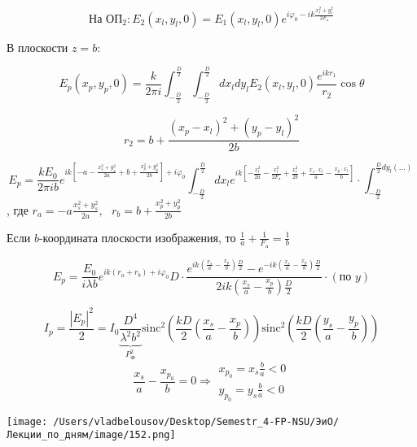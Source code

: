 \documentclass[12pt, a4paper]{report}
\begin{document}
\[ \text{На ОП}_2: E_2 (x_l , y_l , 0 ) = E_1 (x_l, y_l , 0 ) e^{i \varphi_0 - ik \frac{x_l ^2 + y_l ^2 }{2 F_{\text{л} } } }   \] 

В плоскости \( z =b : \) 

\[ E_p (x_p , y_p , 0 ) = \frac{k}{ 2 \pi i } \int_{- \frac{D}{2 } }^{\frac{D}{2 }  }\int_{-\frac{D}{2 } }^{\frac{D}{2 } } d x_l dy _l E_2(x_l , y_l ,0 ) \frac{e^{i k r_1 } }{r_2 } \cos \theta      \] 

\[ r_2 = b + \frac{ (x_p - x_l ) ^2 + (y_p - y_l ) ^2 }{2 b }  \] 

\[ E_p = \frac{k E_0 }{2 \pi  i b } e^{ik \left[ -a - \frac{ x_s ^2 + y_s ^2 }{2a } +b + \frac{ x_p ^2 + y_p ^2 }{2b }   \right] +i \varphi_0}  \int_{-\frac{D}{2 } }^{\frac{D}{2 }  }   dx_l e^{ik \left[ - \frac{x _l ^2 }{2a } - \frac{x_l ^2 }{2 F_{\text{л} } } + \frac{x_l ^2}{2 b }   + \frac{ x_s \cdot x_l }{a } - \frac{ x_p \cdot x_l }{b}      \right]} \cdot \int_{-\frac{D}{2 } }^{\frac{D}{2 }  d y_l (... )}  \] 
, где \( \displaystyle r_a = -a \frac{ x_s ^2 +y _s ^2}{2a } ,\text{ }  r_b = b + \frac{ x_p ^2 + y_p ^2 }{2 b}   \) 

Если \( b \)-координата плоскости изображения, то \( \displaystyle  \frac{1}{a }  + \frac{1}{F_{\text{л} } } = \frac{1}{b}   \) 

\[ E_p = \frac{E_0}{i \lambda b } e^{ik (r_a +r_b ) + i \varphi_0 } D \cdot \frac{ e^{ik \left( \frac{x_s }{a} - \frac{x_p}{b}  \right)\frac{D}{2 } } - e^{- ik \left( \frac{x_s }{a }  - \frac{x_p}{b}   \right)\frac{D}{2 } }  }{2i k \left( \frac{x_s}{a } - \frac{x_p}{b}   \right)\frac{D}{2} } \cdot (\text{по }y )    \] 

\[ I_p = \frac{\left\lvert E_p  \right\rvert ^2 }{2 } = I_0 \underbrace{\frac{ D ^4 }{\lambda ^2 b ^2 }}_{P_{\text{Ф} } ^2 } \mathrm{sinc } ^2 \left( \frac{kD}{2 }  \left( \frac{x_s  }{a } - \frac{x_p}{b}   \right) \right) \mathrm{sinc  } ^2 \left( \frac{kD}{2 } \left( \frac{y_s }{a } - \frac{y_p}{b}   \right) \right)      \] 
\[ \frac{x_s}{a }  - \frac{x_{ p_0 } }{b } =0 \Rightarrow \begin{aligned}
    x_{ p_0 } = x_s \frac{b}{a }  <0  \\
    y_{ p_0 } = y_s \frac{b}{a }  <0 
\end{aligned}   \] 

\begin{center}
    \texttt{[image: /Users/vladbelousov/Desktop/Semestr\_4-FP-NSU/ЭиО/Лекции\_по\_дням/image/152.png]}
\end{center}
\end{document}
